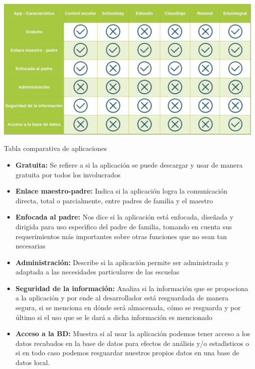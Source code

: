         \begin{table}[H]
            \centering
            \includegraphics[scale=0.3]{Propuesta_Plantilla_Tesis_LaTeX_UAG/imagenes/tabla_comparativa_de_aplicaciones.jpg}
            \caption{Tabla comparativa de aplicaciones}
            \label{tab:comparativa}
        \end{table}
        
        \begin{itemize}
            \item \textbf{Gratuita:} Se refiere a si la aplicación se puede descargar y usar de manera gratuita por todos los involucrados
            
            \item \textbf{Enlace maestro-padre:} Indica si la aplicación logra la comunicación directa, total o parcialmente, entre padres de familia y el maestro
            
            \item \textbf{Enfocada al padre:} Nos dice si la aplicación está enfocada, diseñada y dirigida para uso especı́fico del padre de familia, tomando en cuenta sus requerimientos más importantes sobre otras funciones que no sean tan necesarias \cite{eduintegral}
            
            \item \textbf{Administración:} Describe si la aplicación permite ser administrada y adaptada a las necesidades particulares de las escuelas
            
            \item \textbf{Seguridad de la información:} Analiza si la información que se propociona a la aplicación y por ende al desarrollador está resguardada de manera segura, si se menciona en dónde será almacenada, cómo se resguarda y por último si el uso que se le dará a dicha información es mencionado
            
            \item \textbf{Acceso a la BD:} Muestra si al usar la aplicación podemos tener acceso a los datos recabados en la base de datos para efectos de análisis y/o estadı́sticos o si en todo caso podemos resguardar nuestros propios datos en una base de datos local.
            
        \end{itemize}
